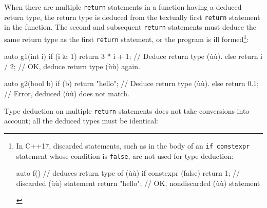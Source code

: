 When there are multiple \lstinline!return! statements in a function having
a deduced return type, the return type is deduced from the textually
first \lstinline!return! statement in the function. The second and
subsequent \lstinline!return! statements must deduce the same return type
as the first \lstinline!return! statement, or the program is ill
formed{\cprotect\footnote{In C++17, discarded statements, such as in the
body of an \lstinline!if!~\lstinline!constexpr! statement whose condition is
\lstinline!false!, are not used for type deduction:

\begin{emcppslisting}[style=footcode,emcppsstandards={c++17}]
auto f()  // deduces return type of (ù{}ù)
{
    if constexpr (false) return 1;  // discarded (ù{}ù) statement
    return "hello";                 // OK, nondiscarded (ù{}ù) statement
}
\end{emcppslisting}
      }}:

\begin{emcppslisting}[emcppsbatch=e2,emcppsstandards={c++14}]
auto g1(int i)
{
    if (i & 1) { return 3 * i + 1; }  // Deduce return type (ù{}ù).
    else       { return i / 2; }      // OK, deduce return type (ù{}ù) again.
}

auto g2(bool b)
{
    if (b) { return "hello"; }  // Deduce return type (ù{}ù).
    else   { return 0.1; }      // Error, deduced (ù{}ù) does not match.
}
\end{emcppslisting}
    

\noindent Type deduction on multiple \lstinline!return! statements does not take
conversions into account; all the deduced types must be identical:

